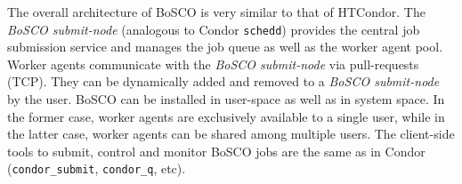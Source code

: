 \documentclass{sig-alternate}
\begin{document}
The overall architecture of BoSCO is very similar to that of HTCondor. The
\textit{BoSCO submit-node} (analogous to Condor \texttt{schedd}) provides the
central job submission service and manages the job queue as well as the worker
agent pool. Worker agents communicate with the \textit{BoSCO submit-node} via
pull-requests (TCP). They can be dynamically added and removed to a
\textit{BoSCO submit-node} by the user. BoSCO can be installed in user-space as
well as in system space. In the former case, worker agents are exclusively
available to a single user, while in the latter case, worker agents can be
shared among multiple users. The client-side tools to submit, control and
monitor BoSCO jobs are the same as in Condor (\texttt{condor\_submit},
\texttt{condor\_q}, etc).





\end{document}
